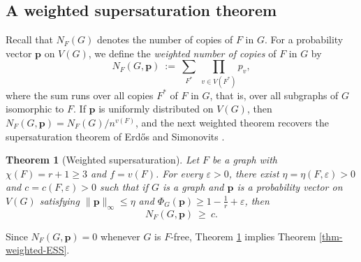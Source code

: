 \documentclass[11pt, a4paper]{article}
\newtheorem{theorem}{Theorem}[section]
\theoremstyle{definition}
\theoremstyle{plain}
\renewcommand{\le}{\leqslant}
\renewcommand{\ge}{\geqslant}
\begin{document}
\subsection{A weighted supersaturation theorem} 

Recall that $N_F(G)$ denotes the number of copies of $F$ in $G$. For a
probability vector $\bm{p}$ on $V(G)$, we define the \emph{weighted
number of copies} of $F$ in $G$ by
\[
  N_F(G,\bm{p})\ :=\ \sum_{F^*}\ \prod_{v\in V(F^*)}p_v ,
\]
where the sum runs over all copies $F^*$ of $F$ in $G$, that is, over
all subgraphs of $G$ isomorphic to $F$. 
 If $\bm{p}$ is uniformly distributed on $V(G)$, then $N_F(G,\bm{p})=N_F(G)/n^{v(F)}$, and the
next weighted theorem recovers the supersaturation theorem of Erd\H{o}s and Simonovits
\cite{ES1983}. 

\begin{theorem}[Weighted supersaturation]
\label{thm:weighted-supersat}
Let $F$ be a graph with $\chi (F)=r+1\ge 3$ and $f=v(F)$. For every
$\varepsilon >0$, there exist $\eta =\eta (F,\varepsilon )>0$ and
$c=c(F,\varepsilon )>0$ such that if $G$ is a graph and $\bm{p}$ is a
probability vector on $V(G)$ satisfying
$\lVert \bm{p}\rVert_\infty\le \eta$ and
$\Phi_G(\bm{p})\ge 1- \frac{1}{r} +\varepsilon$, then
\[ N_F(G,\bm{p})\ \ge\ c.  \]
\end{theorem}

Since $N_F(G,\bm{p})=0$ whenever $G$ is $F$-free, Theorem
\ref{thm:weighted-supersat} implies Theorem \ref{thm-weighted-ESS}. 
\end{document}
